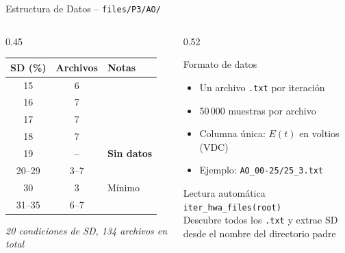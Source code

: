 \documentclass[aspectratio=169,12pt]{beamer}
\begin{document}
\begin{frame}{Estructura de Datos -- \texttt{files/P3/AO/}}
	\begin{columns}
		\begin{column}{0.45\textwidth}
			\centering\scriptsize
			\begin{tabular}{ccl}
				\toprule
				\textbf{SD (\%)} & \textbf{Archivos}
				                 & \textbf{Notas}                         \\
				\midrule
				15               & 6                 &                    \\
				16               & 7                 &                    \\
				17               & 7                 &                    \\
				18               & 7                 &                    \\
				\rowcolor{aerored!15}
				19               & --                & \textbf{Sin datos} \\
				20--29           & 3--7              &                    \\
				30               & 3                 & Mínimo             \\
				31--35           & 6--7              &                    \\
				\bottomrule
			\end{tabular}
			\vspace{0.3em}

			\textit{\tiny 20 condiciones de SD, 134 archivos en total}
		\end{column}
		\begin{column}{0.52\textwidth}
			\begin{block}{Formato de datos}
				\scriptsize
				\begin{itemize}
					\item Un archivo \texttt{.txt} por iteración
					\item 50\,000 muestras por archivo
					\item Columna única: $E(t)$ en voltios (VDC)
					\item Ejemplo: \texttt{AO\_00-25/25\_3.txt}
				\end{itemize}
			\end{block}
			\vspace{0.2em}
			\begin{exampleblock}{Lectura automática}
				\scriptsize
				\texttt{iter\_hwa\_files(root)}\\
				Descubre todos los \texttt{.txt} y extrae SD\\
				desde el nombre del directorio padre
			\end{exampleblock}
		\end{column}
	\end{columns}
\end{frame}
\end{document}
